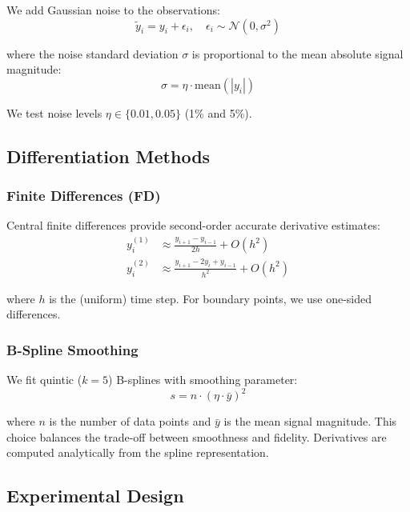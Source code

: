 \documentclass[11pt,a4paper]{article}
\begin{document}
We add Gaussian noise to the observations:
\begin{equation}
\tilde{y}_i = y_i + \epsilon_i, \quad \epsilon_i \sim \mathcal{N}(0, \sigma^2)
\end{equation}

where the noise standard deviation $\sigma$ is proportional to the mean absolute signal magnitude:
\begin{equation}
\sigma = \eta \cdot \text{mean}(|y_i|)
\end{equation}

We test noise levels $\eta \in \{0.01, 0.05\}$ (1\% and 5\%).

\subsection{Differentiation Methods}

\subsubsection{Finite Differences (FD)}

Central finite differences provide second-order accurate derivative estimates:
\begin{align}
y^{(1)}_i &\approx \frac{y_{i+1} - y_{i-1}}{2h} + O(h^2) \\
y^{(2)}_i &\approx \frac{y_{i+1} - 2y_i + y_{i-1}}{h^2} + O(h^2)
\end{align}

where $h$ is the (uniform) time step. For boundary points, we use one-sided differences.

\subsubsection{B-Spline Smoothing}

We fit quintic ($k=5$) B-splines with smoothing parameter:
\begin{equation}
s = n \cdot (\eta \cdot \bar{y})^2
\end{equation}

where $n$ is the number of data points and $\bar{y}$ is the mean signal magnitude. This choice balances the trade-off between smoothness and fidelity. Derivatives are computed analytically from the spline representation.

\subsection{Experimental Design}
\end{document}
